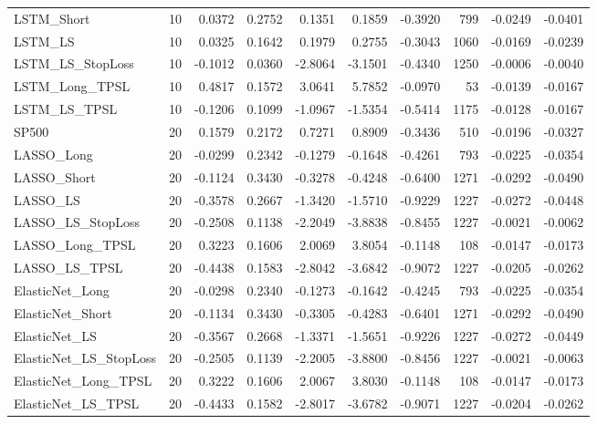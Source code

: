 \begin{tabular}{llrrrrrrrr}
\cline{1-10}
LSTM\_Short & 10 & 0.0372 & 0.2752 & 0.1351 & 0.1859 & -0.3920 & 799 & -0.0249 & -0.0401 \\
\cline{1-10}
LSTM\_LS & 10 & 0.0325 & 0.1642 & 0.1979 & 0.2755 & -0.3043 & 1060 & -0.0169 & -0.0239 \\
\cline{1-10}
LSTM\_LS\_StopLoss & 10 & -0.1012 & 0.0360 & -2.8064 & -3.1501 & -0.4340 & 1250 & -0.0006 & -0.0040 \\
\cline{1-10}
LSTM\_Long\_TPSL & 10 & 0.4817 & 0.1572 & 3.0641 & 5.7852 & -0.0970 & 53 & -0.0139 & -0.0167 \\
\cline{1-10}
LSTM\_LS\_TPSL & 10 & -0.1206 & 0.1099 & -1.0967 & -1.5354 & -0.5414 & 1175 & -0.0128 & -0.0167 \\
\cline{1-10}
SP500 & 20 & 0.1579 & 0.2172 & 0.7271 & 0.8909 & -0.3436 & 510 & -0.0196 & -0.0327 \\
\cline{1-10}
LASSO\_Long & 20 & -0.0299 & 0.2342 & -0.1279 & -0.1648 & -0.4261 & 793 & -0.0225 & -0.0354 \\
\cline{1-10}
LASSO\_Short & 20 & -0.1124 & 0.3430 & -0.3278 & -0.4248 & -0.6400 & 1271 & -0.0292 & -0.0490 \\
\cline{1-10}
LASSO\_LS & 20 & -0.3578 & 0.2667 & -1.3420 & -1.5710 & -0.9229 & 1227 & -0.0272 & -0.0448 \\
\cline{1-10}
LASSO\_LS\_StopLoss & 20 & -0.2508 & 0.1138 & -2.2049 & -3.8838 & -0.8455 & 1227 & -0.0021 & -0.0062 \\
\cline{1-10}
LASSO\_Long\_TPSL & 20 & 0.3223 & 0.1606 & 2.0069 & 3.8054 & -0.1148 & 108 & -0.0147 & -0.0173 \\
\cline{1-10}
LASSO\_LS\_TPSL & 20 & -0.4438 & 0.1583 & -2.8042 & -3.6842 & -0.9072 & 1227 & -0.0205 & -0.0262 \\
\cline{1-10}
ElasticNet\_Long & 20 & -0.0298 & 0.2340 & -0.1273 & -0.1642 & -0.4245 & 793 & -0.0225 & -0.0354 \\
\cline{1-10}
ElasticNet\_Short & 20 & -0.1134 & 0.3430 & -0.3305 & -0.4283 & -0.6401 & 1271 & -0.0292 & -0.0490 \\
\cline{1-10}
ElasticNet\_LS & 20 & -0.3567 & 0.2668 & -1.3371 & -1.5651 & -0.9226 & 1227 & -0.0272 & -0.0449 \\
\cline{1-10}
ElasticNet\_LS\_StopLoss & 20 & -0.2505 & 0.1139 & -2.2005 & -3.8800 & -0.8456 & 1227 & -0.0021 & -0.0063 \\
\cline{1-10}
ElasticNet\_Long\_TPSL & 20 & 0.3222 & 0.1606 & 2.0067 & 3.8030 & -0.1148 & 108 & -0.0147 & -0.0173 \\
\cline{1-10}
ElasticNet\_LS\_TPSL & 20 & -0.4433 & 0.1582 & -2.8017 & -3.6782 & -0.9071 & 1227 & -0.0204 & -0.0262 \\

\end{tabular}
